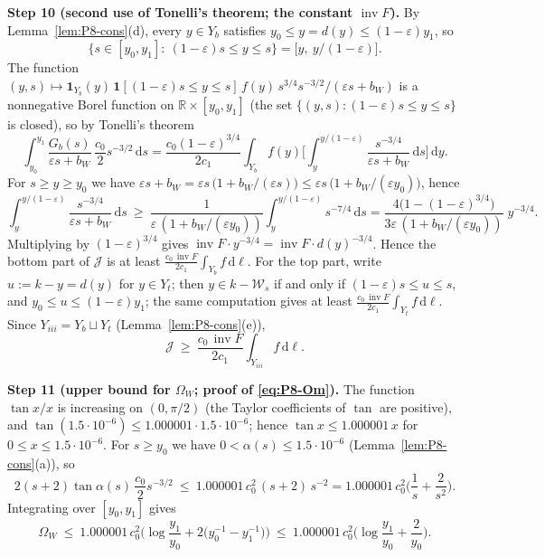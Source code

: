 \documentclass[11pt]{amsart}
\newcommand{\R}{\mathbb R}
\newcommand{\eps}{\varepsilon}
\newcommand{\invF}{\operatorname{inv}F}
\newcommand{\dd}{\,\mathrm d}
\theoremstyle{definition}
\theoremstyle{remark}
\numberwithin{equation}{section}
\begin{document}
\medskip\noindent\textbf{Step 10 (second use of Tonelli's theorem; the constant $\invF$).}
By Lemma~\ref{lem:P8-cons}(d), every $y\in Y_b$ satisfies $y_0\le y=d(y)\le(1-\eps)y_1$, so
\[
\{s\in[y_0,y_1]:\ (1-\eps)s\le y\le s\}=\big[y,\ y/(1-\eps)\big].
\]
The function $(y,s)\mapsto\mathbf 1_{Y_b}(y)\,\mathbf 1[(1-\eps)s\le y\le s]\,f(y)\,s^{3/4}s^{-3/2}/(\eps s+b_W)$ is a
nonnegative Borel function on $\R\times[y_0,y_1]$ (the set $\{(y,s):(1-\eps)s\le y\le s\}$ is closed), so by Tonelli's
theorem
\[
\int_{y_0}^{y_1}\frac{G_b(s)}{\eps s+b_W}\,\frac{c_0}{2}s^{-3/2}\dd s
=\frac{c_0(1-\eps)^{3/4}}{2c_1}\int_{Y_b}f(y)\Big[\int_y^{y/(1-\eps)}\frac{s^{-3/4}}{\eps s+b_W}\dd s\Big]\dd y .
\]
For $s\ge y\ge y_0$ we have $\eps s+b_W=\eps s\,\big(1+b_W/(\eps s)\big)\le\eps s\,\big(1+b_W/(\eps y_0)\big)$, hence
\[
\int_y^{y/(1-\eps)}\frac{s^{-3/4}}{\eps s+b_W}\dd s\ \ge\ \frac{1}{\eps\,(1+b_W/(\eps y_0))}\int_y^{y/(1-\eps)}s^{-7/4}\dd s
=\frac{4\big(1-(1-\eps)^{3/4}\big)}{3\eps\,(1+b_W/(\eps y_0))}\;y^{-3/4} .
\]
Multiplying by $(1-\eps)^{3/4}$ gives $\invF\cdot y^{-3/4}=\invF\cdot d(y)^{-3/4}$. Hence the bottom part of $\mathcal J$ is at
least $\frac{c_0\,\invF}{2c_1}\int_{Y_b}f\dd\ell$. For the top part, write $u:=k-y=d(y)$ for $y\in Y_t$; then
$y\in k-\mathcal W_s$ if and only if $(1-\eps)s\le u\le s$, and $y_0\le u\le(1-\eps)y_1$; the same computation gives at
least $\frac{c_0\,\invF}{2c_1}\int_{Y_t}f\dd\ell$. Since $Y_{iii}=Y_b\sqcup Y_t$ (Lemma~\ref{lem:P8-cons}(e)),
\begin{equation}\label{eq:P8-Ton2}
\mathcal J\ \ge\ \frac{c_0\,\invF}{2c_1}\int_{Y_{iii}}f\dd\ell .
\end{equation}

\medskip\noindent\textbf{Step 11 (upper bound for $\Omega_W$; proof of \eqref{eq:P8-Om}).}
The function $\tan x/x$ is increasing on $(0,\pi/2)$ (the Taylor coefficients of $\tan$ are positive), and
$\tan(1.5\cdot10^{-6})\le1.000001\cdot1.5\cdot10^{-6}$; hence $\tan x\le1.000001\,x$ for $0\le x\le1.5\cdot10^{-6}$. For
$s\ge y_0$ we have $0<\alpha(s)\le1.5\cdot10^{-6}$ (Lemma~\ref{lem:P8-cons}(a)), so
\[
2(s+2)\tan\alpha(s)\,\frac{c_0}{2}s^{-3/2}\ \le\ 1.000001\,c_0^2\,(s+2)\,s^{-2}=1.000001\,c_0^2\Big(\frac1s+\frac2{s^2}\Big).
\]
Integrating over $[y_0,y_1]$ gives
\[
\Omega_W\ \le\ 1.000001\,c_0^2\Big(\log\frac{y_1}{y_0}+2\big(y_0^{-1}-y_1^{-1}\big)\Big)\ \le\ 1.000001\,c_0^2\Big(\log\frac{y_1}{y_0}+\frac{2}{y_0}\Big).
\]
\end{document}
